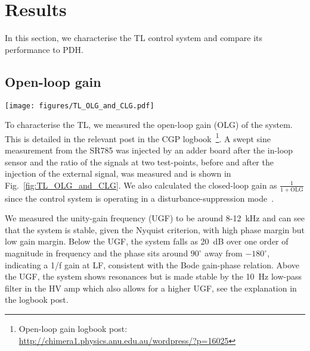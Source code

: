 \documentclass[aps,pra,superscriptaddress,reprint,nofootinbib]{revtex4-1}
\begin{document}
\section{Results}
\label{sec:results}

In this section, we characterise the TL control system and compare its performance to PDH.

\subsection{Open-loop gain}
\label{sec:OLG}

\begin{figure*}
	\texttt{[image: figures/TL\_OLG\_and\_CLG.pdf]}
	\caption{SR785 measurements from 2021-01-05 of Bode amplitude and phase for the transfer function of the TL control system (i.e.\ the OLG) with 10~mV swept sine injected after the in-loop sensor. Also showing the closed-loop gain calculated as $\mathrm{CLG} = \frac{1}{1+\mathrm{OLG}}$ and the unity-gain frequency (UGF) where the gain is 0~dB. The phase measurements are relative to $-180^\circ$.}
	\label{fig:TL_OLG_and_CLG}
\end{figure*}

To characterise the TL, we measured the open-loop gain (OLG) of the system. This is detailed in the relevant post in the CGP logbook~\footnote{Open-loop gain logbook post: \url{http://chimera1.physics.anu.edu.au/wordpress/?p=16025}}. A swept sine measurement from the SR785 was injected by an adder board after the in-loop sensor and the ratio of the signals at two test-points, before and after the injection of the external signal, was measured and is shown in Fig.~\ref{fig:TL_OLG_and_CLG}. We also calculated the closed-loop gain as $\frac{1}{1+\mathrm{OLG}}$ since the control system is operating in a disturbance-suppression mode~\cite{FCS:2000}.

We measured the unity-gain frequency (UGF) to be around 8-12~kHz and can see that the system is stable, given the Nyquist criterion, with high phase margin but low gain margin. Below the UGF, the system falls as 20~dB over one order of magnitude in frequency and the phase sits around $90^\circ$ away from $-180^\circ$, indicating a 1/f gain at LF, consistent with the Bode gain-phase relation. Above the UGF, the system shows resonances but is made stable by the 10~Hz low-pass filter in the HV amp which also allows for a higher UGF, see the explanation in the logbook post.
\end{document}
